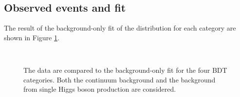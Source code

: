 \subsection{Observed events and \myy fit}
\label{HHyybb:Results:Fit}
The result of the background-only fit of the \myy distribution for each category are shown in Figure \ref{fig:HHyybb:Results:Fit:myy}. 
\begin{figure}[ht]
    \centering
     \\
    \caption{The data are compared to the background-only fit for the four BDT categories. Both the continuum background and the background from single Higgs boson production are considered.}
    \label{fig:HHyybb:Results:Fit:myy}
\end{figure}
